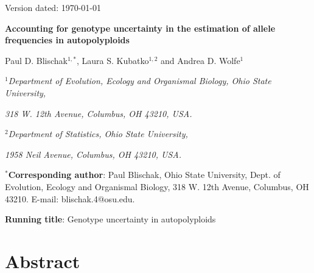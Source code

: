 \documentclass[11pt,english,letterpaper,oneside]{article}
\begin{document}
\newcommand{\tmat}{$\bm{T}$}
\newcommand{\rmat}{$\bm{R}$}
\newcommand{\etal}{\textit{et al}.}
\hfill Version dated: \mydate\today
\vspace{0.25in}

\begin{center}

{\LARGE  \bfseries Accounting for genotype uncertainty in the estimation of allele frequencies in autopolyploids}
\vspace{0.45in}

Paul D. Blischak$^{1,*}$, Laura S. Kubatko$^{1,2}$ and Andrea D. Wolfe$^1$
\vspace{0.45in}


\textit{$^1$Department of Evolution, Ecology and Organismal Biology, Ohio State University,}

\textit{318 W. 12th Avenue, Columbus, OH 43210, USA.}
\bigskip
\bigskip

\textit{$^2$Department of Statistics, Ohio State University,}

\textit{1958 Neil Avenue, Columbus, OH 43210, USA.}


\end{center}
\vspace{0.45in}


\noindent $^*$\textbf{Corresponding author}: Paul Blischak, Ohio State University, Dept. of Evolution, Ecology and Organismal Biology, 318 W. 12th Avenue, Columbus, OH 43210. E-mail: blischak.4@osu.edu.

\vspace{0.45in}

\noindent \textbf{Running title}: Genotype uncertainty in autopolyploids

\vspace{.45in}

\section{Abstract}                      %
\end{document}
